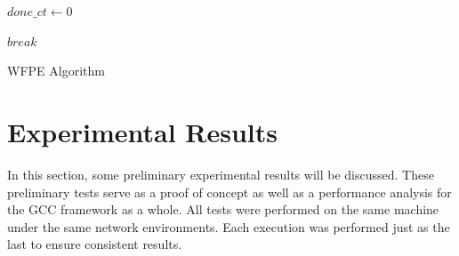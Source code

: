 \documentclass[fleqn,10pt]{SelfArx} %
\begin{document}
\begin{algorithm}
\footnotesize
{}
\DontPrintSemicolon
{}

 {

	$done\_ct \gets 0$

	 {

	}
	 {

		 {

			$break$
		} 
	}
}
%

\caption{WFPE Algorithm}
\label{alg:algorithm2}
\end{algorithm}


\section{Experimental Results}
\label{sec:expresults}

In this section, some preliminary experimental results will be discussed. These preliminary tests serve as a proof of concept as well as a performance analysis for the GCC framework as a whole. All tests were performed on the same machine under the same network environments. Each execution was performed just as the last to ensure consistent results.
\end{document}
